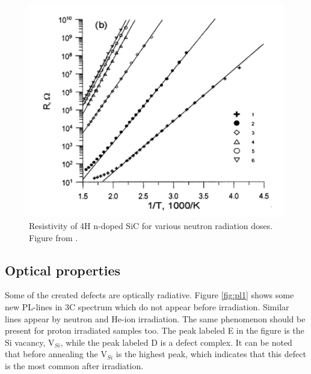 \documentclass[a4paper,12pt]{article}
\begin{document}
\begin{figure}[H]
\begin{center}
\includegraphics[scale=0.7]{resistivity1.png}
\caption{Resistivity of 4H n-doped SiC for various neutron radiation doses. Figure from \cite{Lebedev2000}.
\label{fig:resistivity1}}
\end{center}
\end{figure}

\subsection*{Optical properties}
Some of the created defects are optically radiative. Figure \ref{fig:pl1} shows some new PL-lines in 3C spectrum which do not appear before irradiation. Similar lines appear by neutron \cite{SchneiderJ.andMaierK.1993} and He-ion \cite{L.Patrick1971} irradiation. The same phenomenon should be present for proton irradiated samples too. The peak labeled E in the figure is the Si vacancy, V$_{Si}$, while the peak labeled D is a defect complex. It can be noted that before annealing the V$_{Si}$ is the highest peak, which indicates that this defect is the most common after irradiation. 
\end{document}
